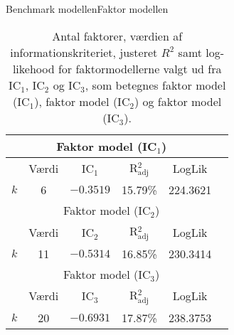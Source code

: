 \begin{frame}{Benchmark modellen}{Faktor modellen}
\begin{table}[h]
\center
\begin{tabular}{lccccc}
\toprule
\multicolumn{5}{c}{Faktor model (IC$_1$)} \\ \midrule
& Værdi &  IC$_1$ &  R$^2_{\text{adj}}$ & LogLik  \\
$k$ & 6 &  $-0.3519$ &  15.79\% &  224.3621  \\ \bottomrule \toprule
\multicolumn{5}{c}{Faktor model (IC$_2$)} \\ \midrule
 & Værdi &  IC$_2$ &  R$^2_{\text{adj}}$ & LogLik \\
 $k$ &11 & $-0.5314$ &  16.85\% &  230.3414 \\\bottomrule \toprule
\multicolumn{5}{c}{Faktor model (IC$_3$)} \\ \midrule
& Værdi &  IC$_3$ &  R$^2_{\text{adj}}$ & LogLik\\
$k$ & 20 & $-0.6931$ & 17.87\% & 238.3753 \\  \bottomrule
 \end{tabular}
 \caption{Antal faktorer, værdien af informationskriteriet, justeret \(R^2\) samt log-likehood for faktormodellerne valgt ud fra IC$_1$, IC$_2$ og IC$_3$, som betegnes faktor model (IC\(_1\)), faktor model (IC\(_2\)) og faktor model (IC\(_3\)).} \label{tab:est_faktor}
\end{table}
\end{frame}


